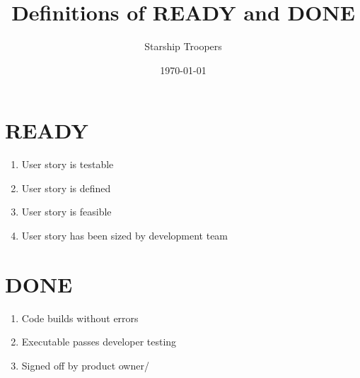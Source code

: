 \documentclass[a4paper,12pt]{article}
\title{Definitions of READY and DONE}
\author{Starship Troopers}
\date{\today}
\begin{document}
\maketitle

\section{READY}
\begin{enumerate}
\item User story is testable
\item User story is defined
\item User story is feasible
\item User story has been sized by development team
\end{enumerate}

\section{DONE}
\begin{enumerate}
\item Code builds without errors
\item Executable passes developer testing
\item Signed off by product owner/
\end{enumerate}
\end{document}
